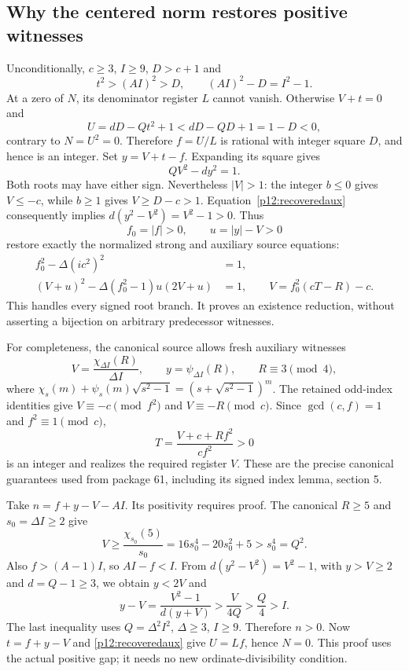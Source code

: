 \subsection{Why the centered norm restores positive witnesses}
\label{p12:center}

Unconditionally, $c\ge3$, $I\ge9$, $D>c+1$ and
\[
 t^2>(AI)^2>D,\qquad (AI)^2-D=I^2-1.
\]
At a zero of $N$, its denominator register $L$ cannot vanish. Otherwise
$V+t=0$ and
\[
 U=dD-Qt^2+1<dD-QD+1=1-D<0,
\]
contrary to $N=U^2=0$. Therefore $f=U/L$ is rational with integer square
$D$, and hence is an integer. Set $y=V+t-f$. Expanding its square gives
\begin{equation}
 QV^2-dy^2=1.                              \label{p12:recoveredaux}
\end{equation}
Both roots may have either sign. Nevertheless $|V|>1$: the integer
$b\le0$ gives $V\le-c$, while $b\ge1$ gives $V\ge D-c>1$.
Equation~\eqref{p12:recoveredaux} consequently implies
$d(y^2-V^2)=V^2-1>0$. Thus
\[
 f_0=|f|>0,\qquad u=|y|-V>0
\]
restore exactly the normalized strong and auxiliary source equations:
\begin{align*}
 f_0^2-\Delta(ic^2)^2&=1,\\
 (V+u)^2-\Delta(f_0^2-1)u(2V+u)&=1,\qquad
 V=f_0^2(cT-R)-c.
\end{align*}
This handles every signed root branch. It proves an existence reduction,
without asserting a bijection on arbitrary predecessor witnesses.

For completeness, the canonical source allows fresh auxiliary witnesses
\[
 V=\frac{\chi_{\Delta I}(R)}{\Delta I},\qquad
 y=\psi_{\Delta I}(R),\qquad R\equiv3\pmod4,
\]
where $\chi_s(m)+\psi_s(m)\sqrt{s^2-1}=(s+\sqrt{s^2-1})^m$.
The retained odd-index identities give $V\equiv-c\pmod{f^2}$ and
$V\equiv-R\pmod c$. Since $\gcd(c,f)=1$ and $f^2\equiv1\pmod c$,
\begin{equation}
 T=\frac{V+c+Rf^2}{cf^2}>0                 \label{p12:freshT}
\end{equation}
is an integer and realizes the required register $V$. These are the
precise canonical guarantees used from package 61, including its signed
index lemma, section 5.

Take $n=f+y-V-AI$. Its positivity requires proof. The canonical $R\ge5$
and $s_0=\Delta I\ge2$ give
\[
 V\ge\frac{\chi_{s_0}(5)}{s_0}
   =16s_0^4-20s_0^2+5>s_0^4=Q^2.
\]
Also $f>(A-1)I$, so $AI-f<I$. From
$d(y^2-V^2)=V^2-1$, with $y>V\ge2$ and $d=Q-1\ge3$, we obtain
$y<2V$ and
\begin{equation}
 y-V=\frac{V^2-1}{d(y+V)}
       >\frac{V}{4Q}>\frac Q4>I.           \label{p12:positivegap}
\end{equation}
The last inequality uses $Q=\Delta^2I^2$, $\Delta\ge3$, $I\ge9$.
Therefore $n>0$. Now $t=f+y-V$ and \eqref{p12:recoveredaux} give $U=Lf$,
hence $N=0$. This proof uses the actual positive gap; it needs no new
ordinate-divisibility condition.

